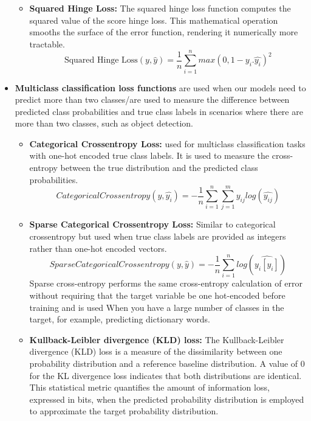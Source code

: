 \begin{itemize}
\begin{itemize}
          \item \textbf{Squared Hinge Loss: } The squared hinge loss function computes the squared value of the score hinge loss. This mathematical operation smooths the surface of the error function, rendering it numerically more tractable.
          \[
          \text{Squared Hinge Loss}(y,\hat{y})=\frac{1}{n}\sum_{i=1}^{n}max(0,1-y_{i}.\hat{y_{i}})^{2}
          \]
      \end{itemize}
    \item \textbf{Multiclass classification loss functions} are used when our models need to predict more than two classes/are used to measure the difference between predicted class probabilities and true class labels in scenarios where there are more than two classes, such as object detection. \\
          \begin{itemize}
          \item \textbf{Categorical Crossentropy Loss: } used for multiclass classification tasks with one-hot encoded true class labels. It is used to measure the cross-entropy between the true distribution and the predicted class probabilities.
          $$Categorical Crossentropy(y,\hat{y_{i}})=-\frac{1}{n}\sum_{i=1}^{n}\sum_{j=1}^{m}y_{ij}log(\hat{y_{ij}})$$
          \item \textbf{Sparse Categorical Crossentropy Loss: } Similar to categorical crossentropy but used when true class labels are provided as integers rather than one-hot encoded vectors.
          $$Sparse Categorical Crossentropy(y,\hat{y})=-\frac{1}{n}\sum_{i=1}^{n}log(\hat{y_{i}[y_{i}]})$$
          Sparse cross-entropy performs the same cross-entropy calculation of error without requiring that the target variable be one hot-encoded before training and is used When you have a large number of classes in the target, for example, predicting dictionary words.
          \item \textbf{Kullback-Leibler divergence (KLD) loss: }The Kullback-Leibler divergence (KLD) loss is a measure of the dissimilarity between one probability distribution and a reference baseline distribution. A value of 0 for the KL divergence loss indicates that both distributions are identical. This statistical metric quantifies the amount of information loss, expressed in bits, when the predicted probability distribution is employed to approximate the target probability distribution.


\end{itemize}
\end{itemize}
